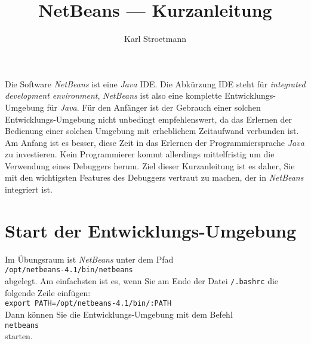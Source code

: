 \documentclass{article}
\title{NetBeans --- Kurzanleitung}
\author{Karl Stroetmann}
\begin{document}
\maketitle

Die Software \textsl{NetBeans} ist eine \textsl{Java} \textsc{IDE}.  Die Abk\"urzung
\textsc{IDE} steht f\"ur \emph{integrated development environment}, \textsl{NetBeans} ist
also eine komplette Entwicklungs-Umgebung f\"ur \textsl{Java}.  F\"ur den Anf\"anger ist der
Gebrauch einer solchen Entwicklungs-Umgebung nicht unbedingt empfehlenswert, da das
Erlernen der Bedienung einer solchen Umgebung mit erheblichem Zeitaufwand verbunden ist.
Am Anfang ist es besser, diese Zeit in das Erlernen der Programmiersprache \textsl{Java}
zu investieren.  Kein Programmierer kommt allerdings mittelfristig um die Verwendung eines
Debuggers herum.  
Ziel dieser Kurzanleitung ist es daher, Sie mit den wichtigsten Features des Debuggers
vertraut zu machen, der in \textsl{NetBeans} integriert ist.

\section{Start der Entwicklungs-Umgebung}
Im Übungsraum ist \textsl{NetBeans} unter dem Pfad \\[0.1cm]
\hspace*{1.3cm} \texttt{/opt/netbeans-4.1/bin/netbeans} \\[0.1cm]
abgelegt.  Am einfachsten ist es, wenn Sie am Ende der Datei \texttt{/.bashrc}
die folgende Zeile einf\"ugen: \\[0.1cm]
\hspace*{1.3cm} \texttt{export PATH=/opt/netbeans-4.1/bin/:PATH} \\[0.1cm]
Dann k\"onnen Sie die Entwicklungs-Umgebung mit dem Befehl \\[0.1cm]
\hspace*{1.3cm} \texttt{netbeans}\\[0.1cm]
starten.
\end{document}
